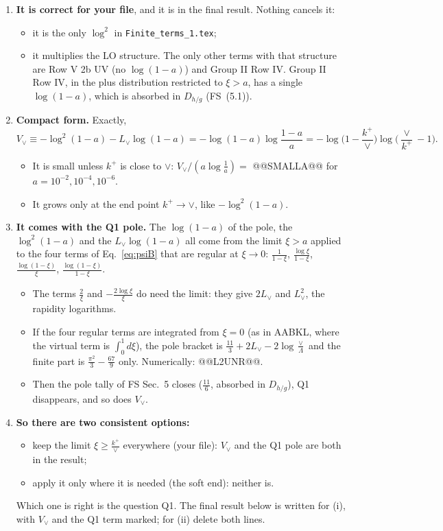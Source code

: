 \documentclass[10pt]{article}
\numberwithin{equation}{section}
\newcommand{\Lv}{L_{\vee}}
\begin{document}
\begin{enumerate}
\item \textbf{It is correct for your file}, and it is in the final result. Nothing cancels it:
\begin{itemize}
\item it is the only $\log^2$ in \texttt{Finite\_terms\_1.tex};
\item it multiplies the LO structure. The only other terms with that structure are Row V 2b UV (no $\log(1-a)$) and Group II Row IV. Group II Row IV, in the plus distribution restricted to $\xi>a$, has a single $\log(1-a)$, which is absorbed in $D_{h/g}$ (FS~(5.1)).
\end{itemize}
\item \textbf{Compact form.} Exactly,
\begin{equation}
V_\vee\equiv-\log^2(1-a)-\Lv\log(1-a)=-\log(1-a)\log\frac{1-a}{a}=-\log\Big(1-\frac{k^+}{\vee}\Big)\log\Big(\frac{\vee}{k^+}-1\Big).
\label{eq:Vv}
\end{equation}
\begin{itemize}
\item It is small unless $k^+$ is close to $\vee$: $V_\vee/(a\log\frac1a)=$ @@SMALLA@@ for $a=10^{-2},10^{-4},10^{-6}$.
\item It grows only at the end point $k^+\to\vee$, like $-\log^2(1-a)$.
\end{itemize}
\item \textbf{It comes with the Q1 pole.} The $\log(1-a)$ of the pole, the $\log^2(1-a)$ and the $\Lv\log(1-a)$ all come from the limit $\xi>a$ applied to the four terms of Eq.~\eqref{eq:psiB} that are regular at $\xi\to0$: $\frac{1}{1-\xi}$, $\frac{\log\xi}{1-\xi}$, $\frac{\log(1-\xi)}{\xi}$, $\frac{\log(1-\xi)}{1-\xi}$.
\begin{itemize}
\item The terms $\frac2\xi$ and $-\frac{2\log\xi}{\xi}$ do need the limit: they give $2\Lv$ and $\Lv^2$, the rapidity logarithms.
\item If the four regular terms are integrated from $\xi=0$ (as in AABKL, where the virtual term is $\int_0^1d\xi$), the pole bracket is $\frac{11}{3}+2\Lv-2\log\frac\vee\Lambda$ and the finite part is $\frac{\pi^2}{3}-\frac{67}{9}$ only. Numerically: @@L2UNR@@.
\item Then the pole tally of FS Sec.~5 closes ($\frac{11}{6}$, absorbed in $D_{h/g}$), Q1 disappears, and so does $V_\vee$.
\end{itemize}
\item \textbf{So there are two consistent options:}
\begin{itemize}
\item[(i)] keep the limit $\xi\ge\frac{k^+}{\vee}$ everywhere (your file): $V_\vee$ and the Q1 pole are both in the result;
\item[(ii)] apply it only where it is needed (the soft end): neither is.
\end{itemize}
Which one is right is the question Q1. The final result below is written for (i), with $V_\vee$ and the Q1 term marked; for (ii) delete both lines.
\end{enumerate}
\end{document}
